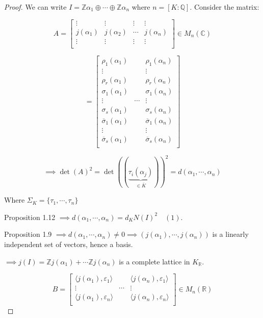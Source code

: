 \documentclass[openany]{amsbook}
\numberwithin{section}{chapter}
\theoremstyle{definition}
\begin{document}
\begin{proof}
    We can write \(I = \mathbb{Z} \alpha_1 \oplus \cdots \oplus \mathbb{Z} \alpha_n\) where \(n = [K : \mathbb{Q}]\). Consider the matrix:

    \[
        A = \begin{bmatrix}
            \vdots & \vdots & \vdots &  \vdots \\
            j(\alpha_1) & j(\alpha_2) & \cdots &  j(\alpha_n) \\
            \vdots & \vdots & \vdots &  \vdots \\
        \end{bmatrix} \in M_n(\mathbb{C})
    \]

    \[
        = \begin{bmatrix}
            \rho_1(\alpha_1) &  &  \rho_1(\alpha_n) \\
            \vdots &  &  \vdots \\
            \rho_r(\alpha_1) &  &  \rho_r(\alpha_n) \\
            \sigma_1(\alpha_1) &  &  \sigma_1(\alpha_n) \\
            \vdots & \cdots &  \vdots \\
            \sigma_s(\alpha_1) &  &  \sigma_s(\alpha_n) \\
            \overline{\sigma}_1(\alpha_1) &  &  \overline{\sigma}_1(\alpha_n) \\
            \vdots &  &  \vdots \\
            \overline{\sigma}_s(\alpha_1) &  &  \overline{\sigma}_s(\alpha_n) \\
        \end{bmatrix}
    \]

    \[
        \implies \det(A)^2 = \det ((\underbrace{\tau_i(\alpha_j)}_{\in \overline{K}}))^2 = d(\alpha_1, \cdots , \alpha_n)
    \]

    Where \(\Sigma_K = \{ \tau_1, \cdots , \tau_n \}\) 

    Proposition 1.12 \(\implies d(\alpha_1, \cdots , \alpha_n) =  d_K  N(I)^2 \quad (1)\).

    Proposition 1.9 \(\implies d(\alpha_1, \cdots , \alpha_n) \neq 0 \implies (j(\alpha_1),\cdots , j(\alpha_n))\) is a linearly independent set of vectors, hence a basis.

    \(\implies j(I) = \mathbb{Z}j(\alpha_1) + \cdots \mathbb{Z} j (\alpha_n)\) is a complete lattice in \(K_\mathbb{R}\).

    \[
        B = \begin{bmatrix}
            \langle j(\alpha_1), \varepsilon_1 \rangle &  &  \langle j(\alpha_n), \varepsilon_1 \rangle  \\
            \vdots & \cdots &  \vdots \\
            \langle j(\alpha_1), \varepsilon_n \rangle  &  &  \langle j(\alpha_n), \varepsilon_n \rangle  \\
        \end{bmatrix} \in M_n(\mathbb{R})
    \]


\end{proof}
\end{document}
